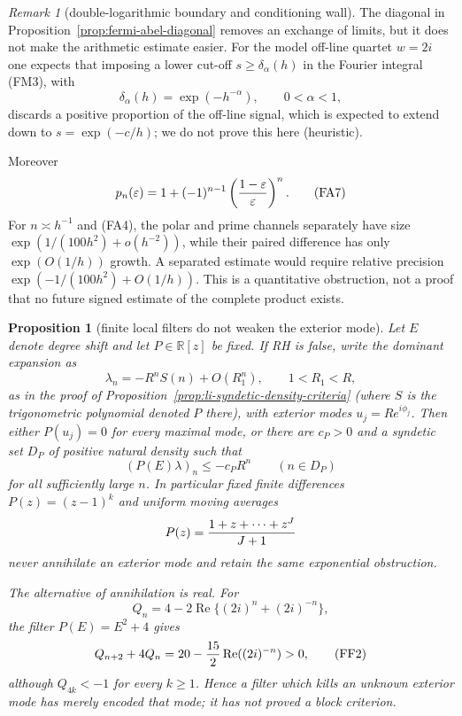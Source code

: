 \documentclass[11pt]{amsart}
\newtheorem{proposition}[theorem]{Proposition}
\theoremstyle{definition}
\theoremstyle{remark}
\newtheorem{remark}[theorem]{Remark}
\theoremstyle{definition}
\renewcommand{\Re}{\operatorname{Re}}
\begin{document}
\begin{remark}[double-logarithmic boundary and conditioning wall]
The diagonal in Proposition~\ref{prop:fermi-abel-diagonal} removes an
exchange of limits, but it does not make the arithmetic estimate easier.
For the model off-line quartet $w=2i$ one expects that imposing a lower
cut-off $s\ge\delta_\alpha(h)$ in the Fourier integral (FM3), with
\[
 \delta_\alpha(h)=\exp(-h^{-\alpha}),\qquad0<\alpha<1,
\]
discards a positive proportion of the off-line signal, which is expected to
extend down to $s=\exp(-c/h)$; we do not prove this here (heuristic).

Moreover
\[
 p_n(\varepsilon)=1+(-1)^{n-1}
       \left({1-\varepsilon\over\varepsilon}\right)^n.     \tag{FA7}
\]
For $n\asymp h^{-1}$ and (FA4), the polar and prime channels separately
have size $\exp(1/(100h^2)+o(h^{-2}))$, while their paired difference has
only $\exp(O(1/h))$ growth.  A separated estimate would require relative
precision $\exp(-1/(100h^2)+O(1/h))$.  This is a quantitative obstruction,
not a proof that no future signed estimate of the complete product exists.
\end{remark}

\begin{proposition}[finite local filters do not weaken the exterior mode]
\label{prop:li-local-filter-gate}
Let $E$ denote degree shift and let $P\in\mathbb R[z]$ be fixed.  If RH is
false, write the dominant expansion as
\[
 \lambda_n=-R^nS(n)+O(R_1^n),\qquad1<R_1<R,
\]
as in the proof of Proposition~\ref{prop:li-syndetic-density-criteria}
(where $S$ is the trigonometric polynomial denoted $P$ there), with exterior modes $u_j=Re^{i\phi_j}$.  Then either
$P(u_j)=0$ for every maximal mode, or there are $c_P>0$ and a syndetic set
$D_P$ of positive natural density such that
\[
 (P(E)\lambda)_n\le-c_PR^n\qquad(n\in D_P)                 \tag{FF1}
\]
for all sufficiently large $n$.  In particular fixed finite differences
$P(z)=(z-1)^k$ and uniform moving averages
\[
 P(z)={1+z+\cdots+z^J\over J+1}
\]
never annihilate an exterior mode and retain the same exponential
obstruction.

The alternative of annihilation is real.  For
\[
 Q_n=4-2\Re\{(2i)^n+(2i)^{-n}\},
\]
the filter $P(E)=E^2+4$ gives
\[
 Q_{n+2}+4Q_n=20-{15\over2}\Re( (2i)^{-n})>0,              \tag{FF2}
\]
although $Q_{4k}<-1$ for every $k\ge1$.  Hence a filter which kills an unknown exterior mode
has merely encoded that mode; it has not proved a block criterion.
\end{proposition}
\end{document}
